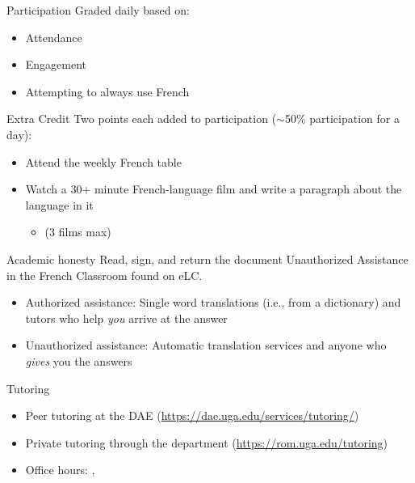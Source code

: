 \begin{frame}{Participation}
  Graded daily based on:
  \begin{itemize}
    \item Attendance
    \item Engagement
    \item Attempting to always use French
  \end{itemize}
\end{frame}

\begin{frame}{Extra Credit}
  Two points each added to participation ($\sim$50\% participation for a day):
  \begin{itemize}
    \item Attend the weekly French table
    \item Watch a 30+ minute French-language film and write a paragraph about the language in it
    \begin{itemize}
      \item (3 films max)
    \end{itemize}
  \end{itemize}
\end{frame}

\begin{frame}{Academic honesty}
  Read, sign, and return the document Unauthorized Assistance in the French Classroom found on eLC.
  \begin{itemize}
    \item Authorized assistance: Single word translations (i.e., from a dictionary) and tutors who help \emph{you} arrive at the answer
    \item Unauthorized assistance: Automatic translation services and anyone who \emph{gives} you the answers
  \end{itemize}
\end{frame}

\begin{frame}{Tutoring}
  \begin{itemize}
    \item Peer tutoring at the DAE (\url{https://dae.uga.edu/services/tutoring/})
    \item Private tutoring through the department (\url{https://rom.uga.edu/tutoring})
    \item Office hours: , 
  \end{itemize}
\end{frame}